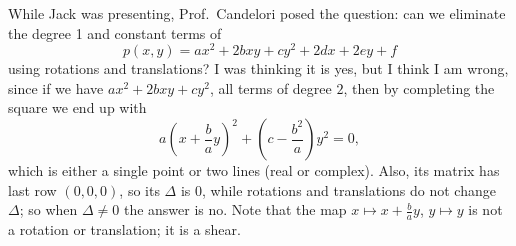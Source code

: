 While Jack was presenting, Prof.~Candelori posed the question: can we eliminate the degree 1 and constant terms of
\[
p(x,y) = ax^2 + 2bxy + cy^2 + 2dx + 2ey + f
\]
using rotations and translations? I was thinking it is yes, but I think I am wrong, since if we have $ax^2 + 2bxy + cy^2$, all terms of degree $2$, then by completing the square we end up with
\[
a\left(x + \frac{b}{a}y\right)^2 + \left(c - \frac{b^2}{a}\right)y^2 = 0,
\]
which is either a single point or two lines (real or complex). Also, its matrix has last row $(0,0,0)$, so its $\Delta$ is $0$, while rotations and translations do not change $\Delta$; so when $\Delta \neq 0$ the answer is no. Note that the map $x \mapsto x + \frac{b}{a}y$, $y \mapsto y$ is not a rotation or translation; it is a shear.


